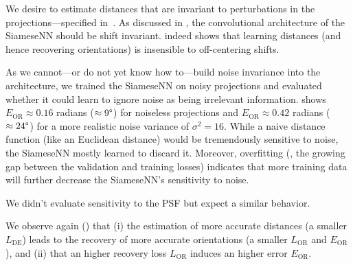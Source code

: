 We desire to estimate distances that are invariant to perturbations in the projections---specified in~.
As discussed in , the convolutional architecture of the SiameseNN should be shift invariant.
 indeed shows that learning distances (and hence recovering orientations) is insensible to off-centering shifts.

As we cannot---or do not yet know how to---build noise invariance into the architecture, we trained the SiameseNN on noisy projections and evaluated whether it could learn to ignore noise as being irrelevant information.
 shows $E_\text{OR} \approx 0.16$ radians ($\approx 9\degree$) for noiseless projections and $E_\text{OR} \approx 0.42$ radians ($\approx 24\degree$) for a more realistic noise variance of $\sigma^2=16$.
While a naive distance function (like an Euclidean distance) would be tremendously sensitive to noise, the SiameseNN mostly learned to discard it.
Moreover, overfitting (\ie, the growing gap between the validation and training losses) indicates that more training data will further decrease the SiameseNN's sensitivity to noise.

We didn't evaluate sensitivity to the PSF but expect a similar behavior.

We observe again () that (i) the estimation of more accurate distances (a smaller $L_\text{DE}$) leads to the recovery of more accurate orientations (a smaller $L_\text{OR}$ and $E_\text{OR}$), and (ii) that an higher recovery loss $L_\text{OR}$ induces an higher error $E_\text{OR}$.


